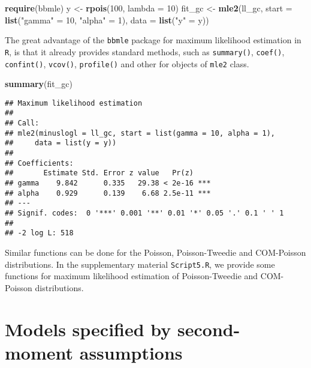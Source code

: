 \documentclass[9pt,a5paper,]{book}
\newenvironment{Shaded}{}{}
\newcommand{\KeywordTok}[1]{\textbf{{#1}}}
\newcommand{\DataTypeTok}[1]{\underline{{#1}}}
\newcommand{\DecValTok}[1]{{#1}}
\newcommand{\StringTok}[1]{{#1}}
\newcommand{\NormalTok}[1]{{#1}}
\renewenvironment{Shaded}{\color{inputcolor}}{}
\renewcommand{\DataTypeTok}[1]{{#1}}
\theoremstyle{definition}
\theoremstyle{definition}
\theoremstyle{remark}
\begin{document}
\begin{Shaded}
\begin{Highlighting}[]
\KeywordTok{require}\NormalTok{(bbmle)}
\NormalTok{y <-}\StringTok{ }\KeywordTok{rpois}\NormalTok{(}\DecValTok{100}\NormalTok{, }\DataTypeTok{lambda =} \DecValTok{10}\NormalTok{)}
\NormalTok{fit_gc <-}\StringTok{ }\KeywordTok{mle2}\NormalTok{(ll_gc, }\DataTypeTok{start =} \KeywordTok{list}\NormalTok{(}\StringTok{"gamma"} \NormalTok{=}\StringTok{ }\DecValTok{10}\NormalTok{, }\StringTok{"alpha"} \NormalTok{=}\StringTok{ }\DecValTok{1}\NormalTok{), }
               \DataTypeTok{data =} \KeywordTok{list}\NormalTok{(}\StringTok{"y"} \NormalTok{=}\StringTok{ }\NormalTok{y))}
\end{Highlighting}
\end{Shaded}

The great advantage of the \texttt{bbmle} package for maximum likelihood
estimation in \texttt{R}, is that it already provides standard methods,
such as \texttt{summary()}, \texttt{coef()}, \texttt{confint()},
\texttt{vcov()}, \texttt{profile()} and other for objects of
\texttt{mle2} class.

\begin{Shaded}
\begin{Highlighting}[]
\KeywordTok{summary}\NormalTok{(fit_gc)}
\end{Highlighting}
\end{Shaded}

\begin{verbatim}
## Maximum likelihood estimation
## 
## Call:
## mle2(minuslogl = ll_gc, start = list(gamma = 10, alpha = 1), 
##     data = list(y = y))
## 
## Coefficients:
##       Estimate Std. Error z value   Pr(z)    
## gamma    9.842      0.335   29.38 < 2e-16 ***
## alpha    0.929      0.139    6.68 2.5e-11 ***
## ---
## Signif. codes:  0 '***' 0.001 '**' 0.01 '*' 0.05 '.' 0.1 ' ' 1
## 
## -2 log L: 518
\end{verbatim}

Similar functions can be done for the Poisson, Poisson-Tweedie and
COM-Poisson distributions. In the supplementary material
\texttt{Script5.R}, we provide some functions for maximum likelihood
estimation of Poisson-Tweedie and COM-Poisson distributions.

\chapter{Models specified by second-moment assumptions}\label{SM}
\end{document}
